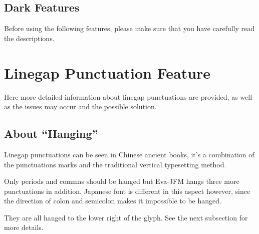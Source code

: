 \documentclass[twoside]{article}
\begin{document}
\subsection{Dark Features}
Before using the following features, please make sure that you have carefully read the descriptions.\par
{}

\section{Linegap Punctuation Feature}
\label{sec:lgp}
Here more detailed information about linegap punctuations are provided, as well as the issues may occur and the possible solution.
\subsection{About ``Hanging''}
Linegap punctuations can be seen in Chinese ancient books, it's a combination of the punctuations marks and the traditional vertical typesetting method.\par
Only periods and commas should be hanged but \textsf{Eva-JFM} hangs three more punctuations in addition. Japanese font is different in this aspect however, since the direction of colon and semicolon makes it impossible to be hanged.\par
They are all hanged to the lower right of the glyph. See the next subsection for more details.
\end{document}
